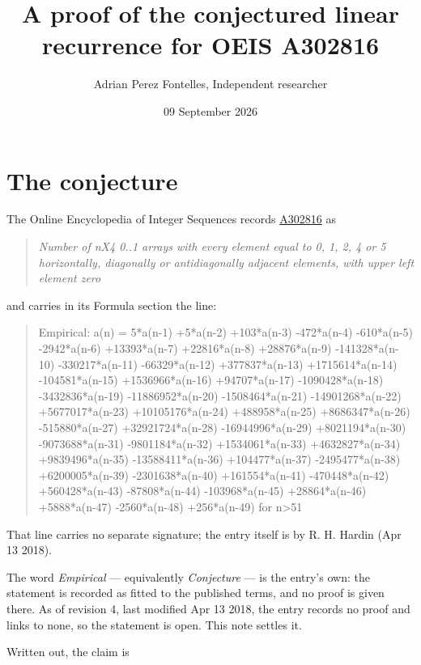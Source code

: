 \documentclass[11pt]{article}
\title{A proof of the conjectured linear recurrence for OEIS A302816}
\author{Adrian Perez Fontelles, Independent researcher}
\date{09 September 2026}
\theoremstyle{definition}
\begin{document}
\maketitle
\section{The conjecture}

The Online Encyclopedia of Integer Sequences records \href{https://oeis.org/A302816}{A302816} as

\begin{quote}\itshape Number of nX4 0..1 arrays with every element equal to 0, 1, 2, 4 or 5 horizontally, diagonally or antidiagonally adjacent elements, with upper left element zero\end{quote}

and carries in its Formula section the line:

\begin{quote}\ttfamily Empirical: a(n) = 5*a(n-1) +5*a(n-2) +103*a(n-3) -472*a(n-4) -610*a(n-5) -2942*a(n-6) +13393*a(n-7) +22816*a(n-8) +28876*a(n-9) -141328*a(n-10) -330217*a(n-11) -66329*a(n-12) +377837*a(n-13) +1715614*a(n-14) -104581*a(n-15) +1536966*a(n-16) +94707*a(n-17) -1090428*a(n-18) -3432836*a(n-19) -11886952*a(n-20) -1508464*a(n-21) -14901268*a(n-22) +5677017*a(n-23) +10105176*a(n-24) +488958*a(n-25) +8686347*a(n-26) -515880*a(n-27) +32921724*a(n-28) -16944996*a(n-29) +8021194*a(n-30) -9073688*a(n-31) -9801184*a(n-32) +1534061*a(n-33) +4632827*a(n-34) +9839496*a(n-35) -13588411*a(n-36) +104477*a(n-37) -2495477*a(n-38) +6200005*a(n-39) -2301638*a(n-40) +161554*a(n-41) -470448*a(n-42) +560428*a(n-43) -87808*a(n-44) -103968*a(n-45) +28864*a(n-46) +5888*a(n-47) -2560*a(n-48) +256*a(n-49) for n>51\end{quote}

That line carries no separate signature; the entry itself is by R. H. Hardin (Apr 13 2018).

The word {\itshape Empirical} --- equivalently {\itshape Conjecture} --- is the entry's own: the statement is recorded as fitted to the published terms, and no proof is given there. As of revision 4, last modified Apr 13 2018, the entry records no proof and links to none, so the statement is open. This note settles it.

Written out, the claim is
\end{document}
